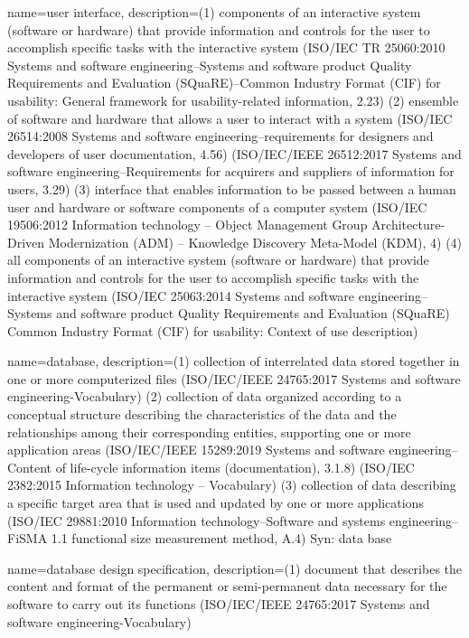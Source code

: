 {
    name={user interface},
    description={(1) components of an interactive system (software or hardware) that provide information and controls for the user to accomplish specific tasks with the interactive system (ISO/IEC TR 25060:2010 Systems and software engineering--Systems and software product Quality Requirements and Evaluation (SQuaRE)--Common Industry Format (CIF) for usability: General framework for usability-related information, 2.23) (2) ensemble of software and hardware that allows a user to interact with a system (ISO/IEC 26514:2008 Systems and software engineering--requirements for designers and developers of user documentation, 4.56) (ISO/IEC/IEEE 26512:2017 Systems and software engineering--Requirements for acquirers and suppliers of information for users, 3.29) (3) interface that enables information to be passed between a human user and hardware or software components of a computer system (ISO/IEC 19506:2012 Information technology -- Object Management Group Architecture-Driven Modernization (ADM) -- Knowledge Discovery Meta-Model (KDM), 4) (4) all components of an interactive system (software or hardware) that provide information and controls for the user to accomplish specific tasks with the interactive system (ISO/IEC 25063:2014 Systems and software engineering--Systems and software product Quality Requirements and Evaluation (SQuaRE) Common Industry Format (CIF) for usability: Context of use description)    }
}

{
    name={database},
    description={(1) collection of interrelated data stored together in one or more computerized files (ISO/IEC/IEEE 24765:2017 Systems and software engineering-Vocabulary) (2) collection of data organized according to a conceptual structure describing the characteristics of the data and the relationships among their corresponding entities, supporting one or more application areas (ISO/IEC/IEEE 15289:2019 Systems and software engineering--Content of life-cycle information items (documentation), 3.1.8) (ISO/IEC 2382:2015 Information technology -- Vocabulary) (3) collection of data describing a specific target area that is used and updated by one or more applications (ISO/IEC 29881:2010 Information technology--Software and systems engineering--FiSMA 1.1 functional size measurement method, A.4) Syn: data base}
}

{
    name={database design specification},
    description={(1) document that describes the content and format of the permanent or semi-permanent data necessary for the software to carry out its functions (ISO/IEC/IEEE 24765:2017 Systems and software engineering-Vocabulary)}
}

